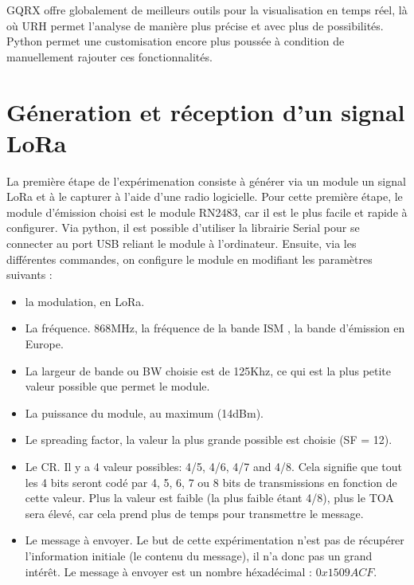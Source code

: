 GQRX offre globalement de meilleurs outils pour la visualisation en temps réel, là où \ac{URH} permet l'analyse de manière plus précise et avec plus de possibilités. Python permet une customisation encore plus poussée à condition de manuellement rajouter ces fonctionnalités.

\newpage

\section{Géneration et réception d'un signal LoRa} \label{signallora}

La première étape de l'expérimenation consiste à générer via un module un signal \ac{LoRa} et à le capturer à l'aide d'une radio logicielle. Pour cette première étape, le module d'émission choisi est le module RN2483, car il est le plus facile et rapide à configurer.
Via python, il est possible d'utiliser la librairie Serial pour se connecter au port \ac{USB} reliant le module à l'ordinateur. Ensuite, via les différentes commandes, on configure le module en modifiant les paramètres suivants : 

\vspace{0.1cm}

\begin{itemize}
\item la modulation, en LoRa.
\item La fréquence. 868MHz, la fréquence de la bande \ac{ISM} , la bande d'émission en Europe.
\item La largeur de bande ou \ac{BW} choisie est de 125Khz, ce qui est la plus petite valeur possible que permet le module.
\item La puissance du module, au maximum (14dBm).
\item Le spreading factor, la valeur la plus grande possible est choisie (SF = 12).
\item Le \ac{CR}. Il y a 4 valeur possibles: 4/5, 4/6, 4/7 and 4/8. Cela signifie que tout les 4 bits seront codé par 4, 5, 6, 7 ou 8 bits de transmissions en fonction de cette valeur. Plus la valeur est faible (la plus faible étant 4/8), plus le \ac{TOA} sera élevé, car cela prend plus de temps pour transmettre le message.
\item Le message à envoyer. Le but de cette expérimentation n'est pas de récupérer l'information initiale (le contenu du message), il n'a donc pas un grand intérêt. Le message à envoyer est un nombre héxadécimal : $0x1509ACF$.
\end{itemize}

